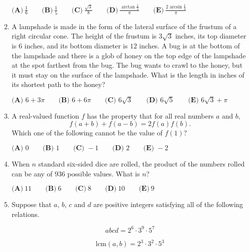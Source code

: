 \documentclass{article}
\begin{document}
\begin{enumerate}[label=\arabic*., itemsep=0.5em]
$\textbf{(A)}~\frac{1}{6}\qquad\textbf{(B)}~\frac{1}{5}\qquad\textbf{(C)}~\frac{\sqrt{3}}{8}\qquad\textbf{(D)}~\frac{\arctan \frac{1}{2}}{\pi}\qquad\textbf{(E)}~\frac{2\arcsin \frac{1}{4}}{\pi}$\par \vspace{0.5em}\item A lampshade is made in the form of the lateral surface of the frustum of a right circular cone. The height of the frustum is $3\sqrt3$ inches, its top diameter is $6$ inches, and its bottom diameter is $12$ inches. A bug is at the bottom of the lampshade and there is a glob of honey on the top edge of the lampshade at the spot farthest from the bug. The bug wants to crawl to the honey, but it must stay on the surface of the lampshade. What is the length in inches of its shortest path to the honey?

$\textbf{(A) } 6 + 3\pi\qquad \textbf{(B) }6 + 6\pi\qquad \textbf{(C) } 6\sqrt3 \qquad \textbf{(D) } 6\sqrt5 \qquad \textbf{(E) } 6\sqrt3 + \pi$\par \vspace{0.5em}\item A real-valued function $f$ has the property that for all real numbers $a$ and $b,$
\begin{equation*}
f(a + b)  + f(a - b) = 2f(a) f(b).
\end{equation*}
Which one of the following cannot be the value of $f(1)?$

$\textbf{(A) } 0 \qquad \textbf{(B) } 1 \qquad \textbf{(C) } -1 \qquad \textbf{(D) } 2 \qquad \textbf{(E) } -2$\par \vspace{0.5em}\item When $n$ standard six-sided dice are rolled, the product of the numbers rolled can be any of $936$ possible values. What is $n$?

$\textbf{(A)}~11\qquad\textbf{(B)}~6\qquad\textbf{(C)}~8\qquad\textbf{(D)}~10\qquad\textbf{(E)}~9$\par \vspace{0.5em}\item Suppose that $a$, $b$, $c$ and $d$ are positive integers satisfying all of the following relations.


\begin{equation*}
abcd=2^6\cdot 3^9\cdot 5^7
\end{equation*}


\begin{equation*}
\text{lcm}(a,b)=2^3\cdot 3^2\cdot 5^3
\end{equation*}



\end{enumerate}
\end{document}
